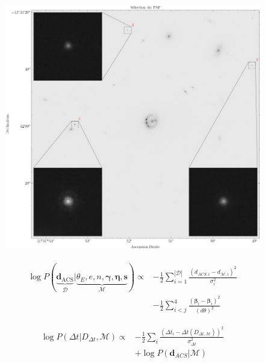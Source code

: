 \documentclass[times,10pt,twocolumn]{article}
\begin{document}
\begin{figure}[H]
        \centering
        \includegraphics[width=0.8\linewidth]{psf_cutout}
        \caption{}
        \label{fig:psf}
\end{figure}



\begin{align}
        \nonumber
        \log P(\underbrace{\mathbf{d}_{\mathrm{ACS}}}_{\mathcal{D}}
        | \underbrace{\theta_E, e, n, \boldsymbol{\gamma}, \mathbf{\eta}, \mathbf{s}}_{\mathcal{M}}) \propto  
        &-\frac{1}{2}\sum_{i=1}^{|\mathcal{D}|} \frac{(d_{ACS,i} - d_{\mathcal{M}, i})^{2}}{\sigma_i^2}
        \\
\label{eq:Inference} 
        &-\frac{1}{2}\sum_{i < j}^{4} \frac{(\boldsymbol{\beta}_{i} - \boldsymbol{\beta}_i)^{2}}{(d\theta)^{2}}
\end{align} 

\begin{align}
\nonumber
        \log P(\Delta t | D_{\Delta t}, \mathcal{M}) \propto 
        &-\frac{1}{2} \sum_i \frac{(\Delta t_i - \Delta t(D_{\Delta t, \mathcal{M}}))^{2}}{\sigma_{\Delta t}^{2}}
        \\\label{eq:JointLikelihood}
        &+\log P(\mathbf{d}_{ACS} | \mathcal{M})
\end{align}
\end{document}
